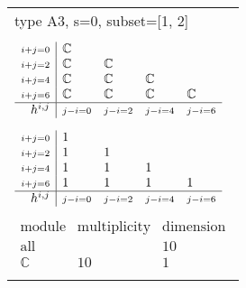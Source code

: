 \documentclass[crop,border=2mm]{standalone}
\begin{document}
\begin{tabular}{l}
{\huge type A3, s=0, subset=[1, 2]}\\ \\


$\displaystyle
\begin{array}{r|l l l l}
	{\scriptstyle i+j=0}&\mathbb{C}&&&\\
	{\scriptstyle i+j=2}&\mathbb{C}&\mathbb{C}&&\\
	{\scriptstyle i+j=4}&\mathbb{C}&\mathbb{C}&\mathbb{C}&\\
	{\scriptstyle i+j=6}&\mathbb{C}&\mathbb{C}&\mathbb{C}&\mathbb{C}\\
	\hline h^{i,j}&{\scriptstyle j-i=0}&{\scriptstyle j-i=2}&{\scriptstyle j-i=4}&{\scriptstyle j-i=6}
\end{array}
$ \\ \\


$\displaystyle
\begin{array}{r|l l l l}
	{\scriptstyle i+j=0}&1&&&\\
	{\scriptstyle i+j=2}&1&1&&\\
	{\scriptstyle i+j=4}&1&1&1&\\
	{\scriptstyle i+j=6}&1&1&1&1\\
	\hline h^{i,j}&{\scriptstyle j-i=0}&{\scriptstyle j-i=2}&{\scriptstyle j-i=4}&{\scriptstyle j-i=6}
\end{array}
$ \\ \\


$\displaystyle
\begin{array}{rll}
	\text{module}&\text{multiplicity}&\text{dimension} \\ \hline \text{all}&&10 \\
	\mathbb{C}&10&1
\end{array}
$ \\ \\

\end{tabular}
\end{document}
